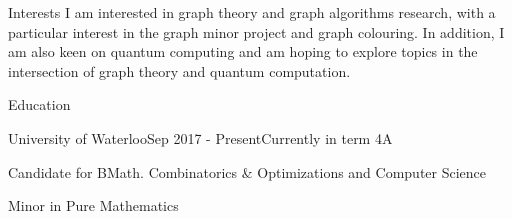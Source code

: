 \documentclass{cv}
\begin{document}
\begin{rSection}{Interests}
	I am interested in graph theory and graph algorithms research, with a particular interest in the graph minor project and graph colouring. In addition, I am also keen on quantum computing and am hoping to explore topics in the intersection of graph theory and quantum computation.
\end{rSection}

\begin{rSection}{Education}

\begin{rSubsection}{University of Waterloo}{Sep 2017 - Present}{Currently in term 4A}{}
	\item Candidate for BMath. Combinatorics \& Optimizations and Computer Science
	\item Minor in Pure Mathematics
\end{rSubsection}



\end{rSection}
\end{document}
